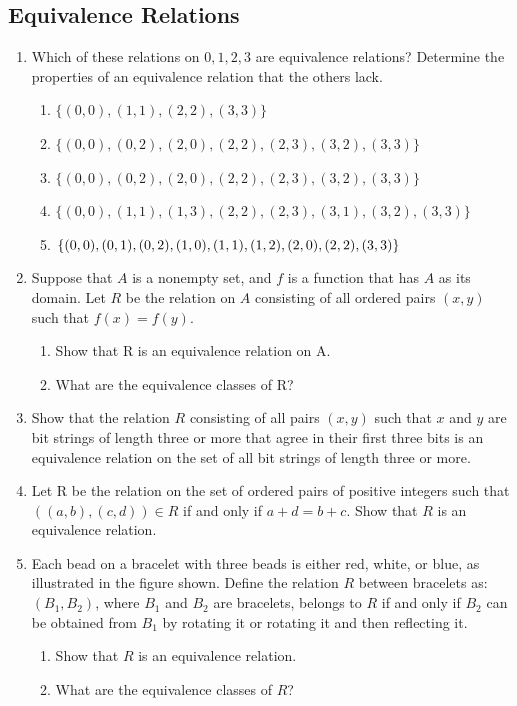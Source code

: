 \documentclass{sig-alternate-05-2015}
\begin{document}
\subsection{Equivalence Relations}
\begin{enumerate}
\item Which of these relations on ${0, 1, 2, 3}$ are equivalence
relations? Determine the properties of an equivalence relation
that the others lack.
	\begin{enumerate}
		\item $\{(0, 0), (1, 1), (2, 2), (3, 3)\}$
		\item $\{(0, 0), (0, 2), (2, 0), (2, 2), (2, 3), (3, 2), (3, 3)\}$
		\item $\{(0, 0), (0, 2), (2, 0), (2, 2), (2, 3), (3, 2), (3, 3)\}$
		\item $\{(0, 0), (1, 1), (1, 3), (2, 2), (2, 3), (3, 1), (3, 2),
			(3, 3)\}$
		\item $\{(0, 0), (0, 1), (0, 2), (1, 0), (1, 1), (1, 2), (2, 0),\\
			(2, 2), (3, 3)\}$
	\end{enumerate}
	
\item Suppose that $A$ is a nonempty set, and $f$ is a function that
has $A$ as its domain. Let $R$ be the relation on $A$ consisting
of all ordered pairs $(x, y)$ such that $f (x) = f (y)$.
	\begin{enumerate}
		\item Show that R is an equivalence relation on A.
		\item What are the equivalence classes of R?
	\end{enumerate}
	
\item Show that the relation $R$ consisting of all pairs $(x, y)$ such
that $x$ and $y$ are bit strings of length three or more that
agree in their first three bits is an equivalence relation on
the set of all bit strings of length three or more.

\item Let R be the relation on the set of ordered pairs of positive
integers such that $((a, b), (c, d)) \in R $ if and only if
$a + d = b + c$. Show that $R$ is an equivalence relation.

\item Each bead on a bracelet with three beads is either red,
white, or blue, as illustrated in the figure shown.
Define the relation $R$ between bracelets as: $(B_1,B_2)$,
where $B_1$ and $B_2$ are bracelets, belongs to $R$ if and only
if $B_2$ can be obtained from $B_1$ by rotating it or rotating it
and then reflecting it.
\begin{enumerate}
	\item Show that $R$ is an equivalence relation.
	\item What are the equivalence classes of $R$?
\end{enumerate}


\end{enumerate}
\end{document}
